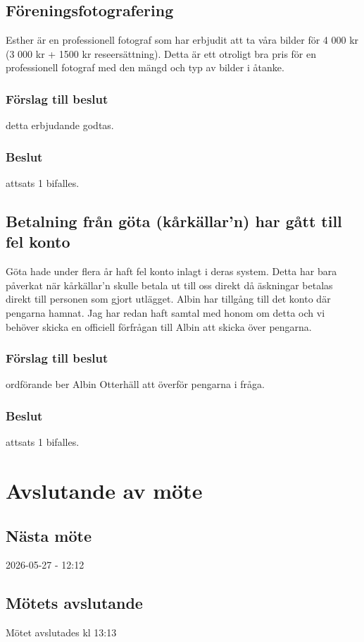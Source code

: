 \documentclass[protokoll]{dvd}
\begin{document}
\subsection{Föreningsfotografering}
Esther är en professionell fotograf som har erbjudit att ta våra bilder för 4 000 kr (3 000  kr + 1500 kr reseersättning). 
Detta är ett otroligt bra pris för en professionell fotograf med den mängd och typ av bilder i åtanke. 

\subsubsection*{Förslag till beslut}
\begin{attsatser}
    \item detta erbjudande godtas.
\end{attsatser}
\subsubsection*{Beslut}
\begin{attsatser}
    \item attsats 1 bifalles.
\end{attsatser}

\subsection{Betalning från göta (kårkällar'n) har gått till fel konto}
Göta hade under flera år haft fel konto inlagt i deras system. Detta har bara påverkat när kårkällar'n skulle betala ut till oss direkt då äskningar betalas direkt till personen som gjort utlägget. Albin har tillgång till det konto där pengarna hamnat. Jag har redan haft samtal med honom om detta och vi behöver skicka en officiell förfrågan till Albin att skicka över pengarna. 
\subsubsection*{Förslag till beslut}
\begin{attsatser}
    \item ordförande ber Albin Otterhäll att överför pengarna i fråga.
\end{attsatser}
\subsubsection*{Beslut} 
\begin{attsatser}     
\item attsats 1 bifalles. 
\end{attsatser}



\newpage
\section{Avslutande av möte}

\subsection{Nästa möte}
2026-05-27 - 12:12

\subsection{Mötets avslutande}
Mötet avslutades kl 13:13 

\styrelsesignaturer
\end{document}
